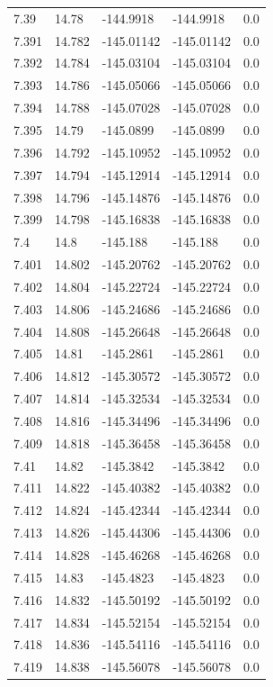 \begin{tabular}{lllll}
7.39 & 14.78 & -144.9918 & -144.9918 & 0.0 \\
7.391 & 14.782 & -145.01142 & -145.01142 & 0.0 \\
7.392 & 14.784 & -145.03104 & -145.03104 & 0.0 \\
7.393 & 14.786 & -145.05066 & -145.05066 & 0.0 \\
7.394 & 14.788 & -145.07028 & -145.07028 & 0.0 \\
7.395 & 14.79 & -145.0899 & -145.0899 & 0.0 \\
7.396 & 14.792 & -145.10952 & -145.10952 & 0.0 \\
7.397 & 14.794 & -145.12914 & -145.12914 & 0.0 \\
7.398 & 14.796 & -145.14876 & -145.14876 & 0.0 \\
7.399 & 14.798 & -145.16838 & -145.16838 & 0.0 \\
7.4 & 14.8 & -145.188 & -145.188 & 0.0 \\
7.401 & 14.802 & -145.20762 & -145.20762 & 0.0 \\
7.402 & 14.804 & -145.22724 & -145.22724 & 0.0 \\
7.403 & 14.806 & -145.24686 & -145.24686 & 0.0 \\
7.404 & 14.808 & -145.26648 & -145.26648 & 0.0 \\
7.405 & 14.81 & -145.2861 & -145.2861 & 0.0 \\
7.406 & 14.812 & -145.30572 & -145.30572 & 0.0 \\
7.407 & 14.814 & -145.32534 & -145.32534 & 0.0 \\
7.408 & 14.816 & -145.34496 & -145.34496 & 0.0 \\
7.409 & 14.818 & -145.36458 & -145.36458 & 0.0 \\
7.41 & 14.82 & -145.3842 & -145.3842 & 0.0 \\
7.411 & 14.822 & -145.40382 & -145.40382 & 0.0 \\
7.412 & 14.824 & -145.42344 & -145.42344 & 0.0 \\
7.413 & 14.826 & -145.44306 & -145.44306 & 0.0 \\
7.414 & 14.828 & -145.46268 & -145.46268 & 0.0 \\
7.415 & 14.83 & -145.4823 & -145.4823 & 0.0 \\
7.416 & 14.832 & -145.50192 & -145.50192 & 0.0 \\
7.417 & 14.834 & -145.52154 & -145.52154 & 0.0 \\
7.418 & 14.836 & -145.54116 & -145.54116 & 0.0 \\
7.419 & 14.838 & -145.56078 & -145.56078 & 0.0 \\

\end{tabular}
